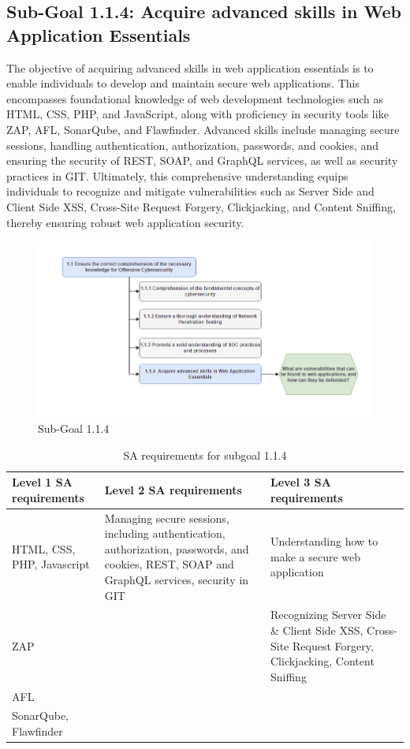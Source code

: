 \newpage
\subsection{Sub-Goal 1.1.4: Acquire advanced skills in Web Application Essentials}
The objective of acquiring advanced skills in web application essentials is to enable individuals to develop and maintain secure web applications. This encompasses foundational knowledge of web development technologies such as HTML, CSS, PHP, and JavaScript, along with proficiency in security tools like ZAP, AFL, SonarQube, and Flawfinder. Advanced skills include managing secure sessions, handling authentication, authorization, passwords, and cookies, and ensuring the security of REST, SOAP, and GraphQL services, as well as security practices in GIT. Ultimately, this comprehensive understanding equips individuals to recognize and mitigate vulnerabilities such as Server Side and Client Side XSS, Cross-Site Request Forgery, Clickjacking, and Content Sniffing, thereby ensuring robust web application security.

\begin{figure}[H]
    \centering
    \includegraphics[width=\textwidth]{./assets/subgoal_1.1.4.png}
    \caption{Sub-Goal 1.1.4}
    \label{fig:subgoal1.1.4}
\end{figure}

\begin{table}[H]
\begin{center}
\begin{tabular}{ | m{5cm} | m{5cm}| m{5cm} | } 
  \hline
  \textbf{Level 1 SA requirements} & \textbf{Level 2 SA requirements}  & \textbf{Level 3 SA requirements}  \\ 
  \hline
  HTML, CSS, PHP, Javascript & Managing secure sessions, including authentication, authorization, passwords, and cookies, REST, SOAP and GraphQL services, security in GIT & Understanding how to make a secure web application\\ 
  \hline
  ZAP &  & Recognizing Server Side \& Client Side XSS, Cross-Site Request Forgery, Clickjacking, Content Sniffing\\ 
  \hline
  AFL &  & \\ 
  \hline
  SonarQube, Flawfinder &  & \\ 
  \hline
\end{tabular}
\end{center}
\caption{SA requirements for subgoal 1.1.4}
\end{table}

